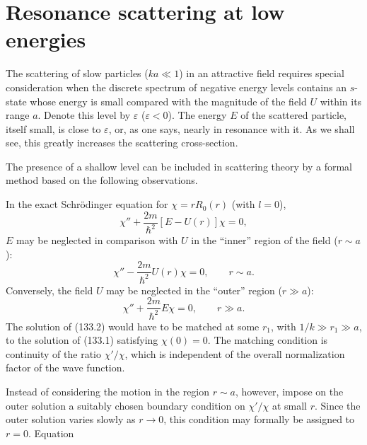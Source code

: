 \section{Resonance scattering at low energies}

The scattering of slow particles ($ka\ll1$) in an attractive field requires
special consideration when the discrete spectrum of negative energy levels
contains an $s$-state whose energy is small compared with the magnitude of the
field $U$ within its range $a$. Denote this level by $\varepsilon$
($\varepsilon<0$). The energy $E$ of the scattered particle, itself small, is
close to $\varepsilon$, or, as one says, nearly in resonance with it. As we
shall see, this greatly increases the scattering cross-section.

The presence of a shallow level can be included in scattering theory by a
formal method based on the following observations.

In the exact Schrödinger equation for $\chi=rR_0(r)$ (with $l=0$),
\[
 \chi''+\frac{2m}{\hbar^2}[E-U(r)]\chi=0,
\]
$E$ may be neglected in comparison with $U$ in the ``inner'' region of the
field ($r\sim a$):
\begin{equation}
 \chi''-\frac{2m}{\hbar^2}U(r)\chi=0,\qquad r\sim a.
 \tag{133.1}
\end{equation}
Conversely, the field $U$ may be neglected in the ``outer'' region
($r\gg a$):
\begin{equation}
 \chi''+\frac{2m}{\hbar^2}E\chi=0,\qquad r\gg a.
 \tag{133.2}
\end{equation}
The solution of (133.2) would have to be matched at some $r_1$, with
$1/k\gg r_1\gg a$, to the solution of (133.1) satisfying $\chi(0)=0$. The
matching condition is continuity of the ratio $\chi'/\chi$, which is
independent of the overall normalization factor of the wave function.

Instead of considering the motion in the region $r\sim a$, however, impose
on the outer solution a suitably chosen boundary condition on $\chi'/\chi$
at small $r$. Since the outer solution varies slowly as $r\to0$, this
condition may formally be assigned to $r=0$. Equation

